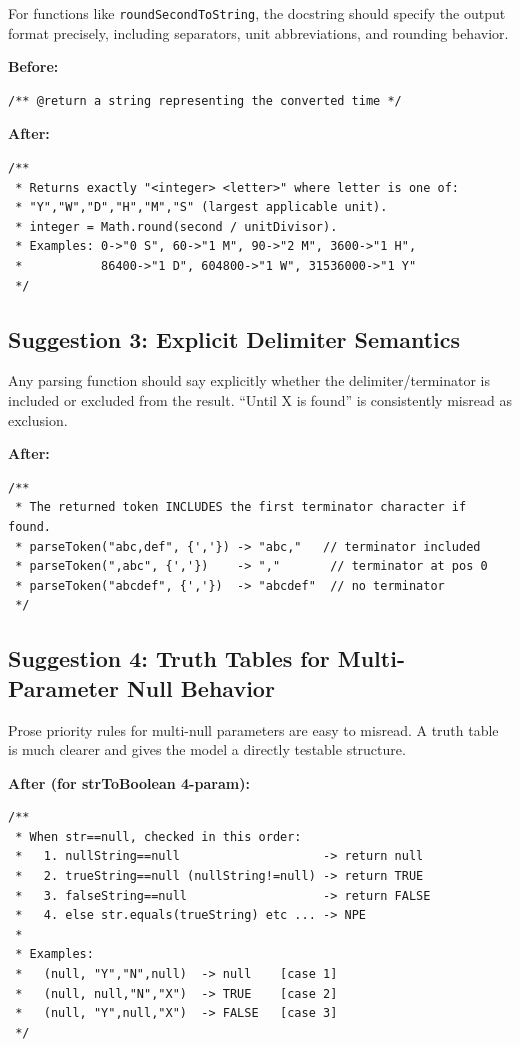 \documentclass[acmsmall,nonacm]{acmart}
\begin{document}
For functions like \texttt{roundSecondToString}, the docstring should specify the output
format precisely, including separators, unit abbreviations, and rounding behavior.

\noindent\textbf{Before:}
\begin{lstlisting}[style=java, numbers=none]
/** @return a string representing the converted time */
\end{lstlisting}

\noindent\textbf{After:}
\begin{lstlisting}[style=java, numbers=none]
/**
 * Returns exactly "<integer> <letter>" where letter is one of:
 * "Y","W","D","H","M","S" (largest applicable unit).
 * integer = Math.round(second / unitDivisor).
 * Examples: 0->"0 S", 60->"1 M", 90->"2 M", 3600->"1 H",
 *           86400->"1 D", 604800->"1 W", 31536000->"1 Y"
 */
\end{lstlisting}

\subsection{Suggestion 3: Explicit Delimiter Semantics}

Any parsing function should say explicitly whether the delimiter/terminator is included or
excluded from the result. ``Until X is found'' is consistently misread as exclusion.

\noindent\textbf{After:}
\begin{lstlisting}[style=java, numbers=none]
/**
 * The returned token INCLUDES the first terminator character if found.
 * parseToken("abc,def", {','}) -> "abc,"   // terminator included
 * parseToken(",abc", {','})    -> ","       // terminator at pos 0
 * parseToken("abcdef", {','})  -> "abcdef"  // no terminator
 */
\end{lstlisting}

\subsection{Suggestion 4: Truth Tables for Multi-Parameter Null Behavior}

Prose priority rules for multi-null parameters are easy to misread. A truth table is much
clearer and gives the model a directly testable structure.

\noindent\textbf{After (for strToBoolean 4-param):}
\begin{lstlisting}[style=java, numbers=none]
/**
 * When str==null, checked in this order:
 *   1. nullString==null                    -> return null
 *   2. trueString==null (nullString!=null) -> return TRUE
 *   3. falseString==null                   -> return FALSE
 *   4. else str.equals(trueString) etc ... -> NPE
 *
 * Examples:
 *   (null, "Y","N",null)  -> null    [case 1]
 *   (null, null,"N","X")  -> TRUE    [case 2]
 *   (null, "Y",null,"X")  -> FALSE   [case 3]
 */
\end{lstlisting}
\end{document}
